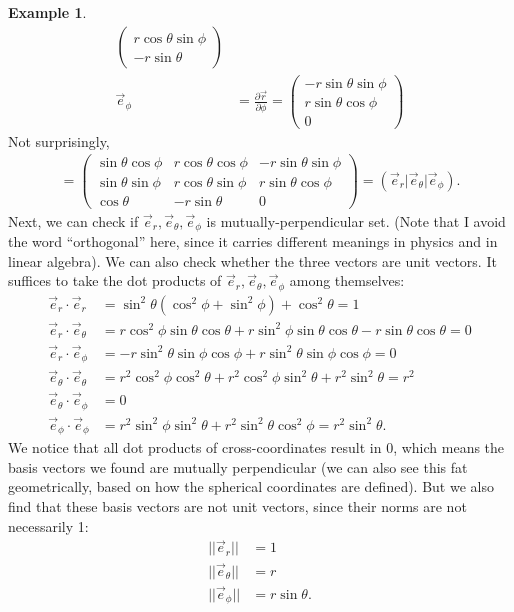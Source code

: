 \documentclass{book}
\theoremstyle{definition}
\newtheorem{exmp}{Example}[section]
\begin{document}
\begin{exmp}
\begin{align*}
\begin{pmatrix}
r\cos\theta\sin\phi\\
-r\sin\theta
\end{pmatrix}\\
\vec{e}_\phi &= \frac{\partial \vec{r}}{\partial \phi}=
\begin{pmatrix}
-r\sin\theta\sin\phi\\
r\sin\theta\cos\phi\\
0
\end{pmatrix}
\end{align*} 
Not surprisingly,
\begin{align*}
[U^{j'}_i] = 
\begin{pmatrix}
\sin\theta\cos\phi & r\cos\theta\cos\phi & -r\sin\theta\sin\phi \\
\sin\theta\sin\phi & r\cos\theta\sin\phi & r\sin\theta\cos\phi \\
\cos\theta & -r\sin\theta & 0
\end{pmatrix}
=
\left( \vec{e}_r \vert \vec{e}_\theta \vert \vec{e}_\phi \right).
\end{align*}
Next, we can check if ${\vec{e}_r, \vec{e}_\theta, \vec{e}_\phi}$ is mutually-perpendicular set. (Note that I avoid the word ``orthogonal'' here, since it carries different meanings in physics and in linear algebra). We can also check whether the three vectors are unit vectors. It suffices to take the dot products of ${\vec{e}_r, \vec{e}_\theta, \vec{e}_\phi}$ among themselves:
\begin{align*}
\vec{e}_r\cdot\vec{e}_r &= \sin^2\theta(\cos^2\phi + \sin^2\phi) + \cos^2\theta = 1\\
\vec{e}_r\cdot\vec{e}_\theta &= r\cos^2\phi\sin\theta\cos\theta + r\sin^2\phi\sin\theta\cos\theta - r\sin\theta\cos\theta = 0\\
\vec{e}_r\cdot\vec{e}_\phi &= -r\sin^2\theta\sin\phi\cos\phi + r\sin^2\theta\sin\phi\cos\phi = 0\\ 
\vec{e}_\theta\cdot\vec{e}_\theta &= r^2\cos^2\phi\cos^2\theta + r^2\cos^2\phi\sin^2\theta + r^2\sin^2\theta = r^2\\ 
\vec{e}_\theta\cdot\vec{e}_\phi &= 0 \\
\vec{e}_\phi\cdot\vec{e}_\phi &= r^2\sin^2\phi\sin^2\theta + r^2\sin^2\theta\cos^2\phi = r^2\sin^2\theta.
\end{align*}
We notice that all dot products of cross-coordinates result in 0, which means the basis vectors we found are mutually perpendicular (we can also see this fat geometrically, based on how the spherical coordinates are defined). But we also find that these basis vectors are not unit vectors, since their norms are not necessarily 1:
\begin{align*}
\vert\vert \vec{e}_r \vert\vert &= 1\\
\vert\vert \vec{e}_\theta \vert\vert &= r\\
\vert\vert \vec{e}_\phi \vert\vert &= r\sin\theta.
\end{align*}
\end{exmp}
\end{document}

